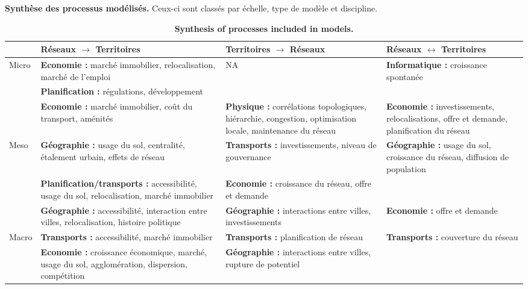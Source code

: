 \begin{table}%
\caption{\textbf{Synthesis of processes included in models.}\label{tab:modelography:processes}}{\textbf{Synthèse des processus modélisés.} Ceux-ci sont classés par échelle, type de modèle et discipline. \label{tab:modelography:processes}}
\begin{tabular}{|l|p{5.5cm}|p{5.5cm}|p{5.5cm}|}
\hline
 & Réseaux $\rightarrow$ Territoires & Territoires $\rightarrow$ Réseaux & Réseaux $\leftrightarrow$ Territoires\\ \hline
\multirow{2}{*}{Micro} &
\textbf{Economie : } marché immobilier, relocalisation, marché de l'emploi & NA & \textbf{Informatique : } croissance spontanée \\\cline{2-2}
& \textbf{Planification : } régulations, développement & & \\\hline
& \textbf{Economie : } marché immobilier, coût du transport, aménités & \textbf{Physique : } corrélations topologiques, hiérarchie, congestion, optimisation locale, maintenance du réseau & \textbf{Economie : } investissements, relocalisations, offre et demande, planification du réseau\\\cline{2-4}
\multirow{2}{*}{Meso}& \textbf{Géographie : } usage du sol, centralité, étalement urbain, effets de réseau & \textbf{Transports : } investissements, niveau de gouvernance & \textbf{Géographie : } usage du sol, croissance du réseau, diffusion de population \\\cline{2-4}
& \textbf{Planification/transports : } accessibilité, usage du sol, relocalisation, marché immobilier & \textbf{Economie : } croissance du réseau, offre et demande & \\\hline
& \textbf{Géographie : } accessibilité, interaction entre villes, relocalisation, histoire politique  & \textbf{Géographie : } interactions entre villes, investissements & \textbf{Economie : } offre et demande \\ \cline{2-4}
\multirow{2}{*}{Macro} & \textbf{Transports : } accessibilité, marché immobilier & \textbf{Transports : } planification de réseau & \textbf{Transports : } couverture du réseau \\\cline{2-3}\cline{4-4}
& \textbf{Economie : } croissance économique, marché, usage du sol, agglomération, dispersion, compétition & \textbf{Géographie : } interactions entre villes, rupture de potentiel & \\\hline
\end{tabular}
\end{table}

